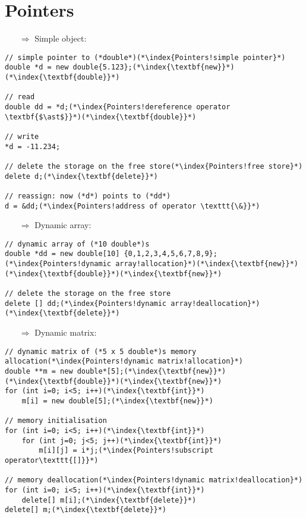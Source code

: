 \documentclass[10pt]{article}
\begin{document}
\section{Pointers}
\small
\begin{enumerate}
\item[$\Rightarrow$] Simple object:
\end{enumerate}
\begin{lstlisting}
// simple pointer to (*double*)(*\index{Pointers!simple pointer}*)
double *d = new double{5.123};(*\index{\textbf{new}}*)(*\index{\textbf{double}}*)

// read
double dd = *d;(*\index{Pointers!dereference operator \textbf{$\ast$}}*)(*\index{\textbf{double}}*)

// write
*d = -11.234;

// delete the storage on the free store(*\index{Pointers!free store}*)
delete d;(*\index{\textbf{delete}}*)

// reassign: now (*d*) points to (*dd*)
d = &dd;(*\index{Pointers!address of operator \texttt{\&}}*)
\end{lstlisting}
\begin{enumerate}
\item[$\Rightarrow$] Dynamic array:
\end{enumerate}
\begin{lstlisting}
// dynamic array of (*10 double*)s
double *dd = new double[10] {0,1,2,3,4,5,6,7,8,9};(*\index{Pointers!dynamic array!allocation}*)(*\index{\textbf{new}}*)(*\index{\textbf{double}}*)(*\index{\textbf{new}}*)

// delete the storage on the free store
delete [] dd;(*\index{Pointers!dynamic array!deallocation}*)(*\index{\textbf{delete}}*)
\end{lstlisting}
\begin{enumerate}
\item[$\Rightarrow$] Dynamic matrix:
\end{enumerate}
\begin{lstlisting}
// dynamic matrix of (*5 x 5 double*)s memory allocation(*\index{Pointers!dynamic matrix!allocation}*)
double **m = new double*[5];(*\index{\textbf{new}}*)(*\index{\textbf{double}}*)(*\index{\textbf{new}}*)
for (int i=0; i<5; i++)(*\index{\textbf{int}}*)
    m[i] = new double[5];(*\index{\textbf{new}}*)

// memory initialisation    
for (int i=0; i<5; i++)(*\index{\textbf{int}}*)
    for (int j=0; j<5; j++)(*\index{\textbf{int}}*)
        m[i][j] = i*j;(*\index{Pointers!subscript operator\texttt{[]}}*)

// memory deallocation(*\index{Pointers!dynamic matrix!deallocation}*)
for (int i=0; i<5; i++)(*\index{\textbf{int}}*)
    delete[] m[i];(*\index{\textbf{delete}}*)
delete[] m;(*\index{\textbf{delete}}*)
\end{lstlisting}
\end{document}
